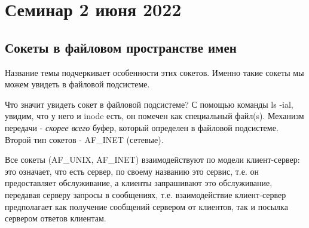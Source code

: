 \documentclass[12pt,a4paper]{scrreprt}
\begin{document}
\chapter{\textbf{Семинар 2 июня 2022}}

\section{Сокеты в файловом пространстве имен}

Название темы подчеркивает особенности этих сокетов. Именно такие сокеты мы можем увидеть в файловой подсистеме.

Что значит увидеть сокет в файловой подсистеме? С помощью команды ls -ial, увидим, что у него и inode есть, он помечен как специальный файл(s). Механизм передачи - \textit{скорее всего} буфер, который определен в файловой подсистеме. Второй тип сокетов - AF\_INET (сетевые). 

Все сокеты (AF\_UNIX, AF\_INET) взаимодействуют по модели клиент-сервер: это означает, что есть сервер, по своему названию это сервис, т.е. он предоставляет обслуживание, а клиенты запрашивают это обслуживание, передавая серверу запросы в сообщениях, т.е. взаимодействие клиент-сервер предполагает как получение сообщений сервером от клиентов, так и посылка сервером ответов клиентам. 

\begin{figure}[!h]
\end{figure}
\end{document}

